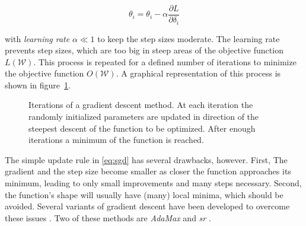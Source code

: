 \begin{equation}
    \label{eq:sgd}
    \theta_i = \theta_i - \alpha \frac{\partial L}{\partial \delta_i}
\end{equation}

with \textit{learning rate} $\alpha \ll 1$ to keep the step sizes moderate. The learning rate prevents step sizes, which are too big in steep 
areas of the objective function $L(\mathcal{W})$.
This process is repeated for a defined number of iterations to minimize the objective function $O(\mathcal{W})$.
A graphical representation of this process is shown in figure~\ref{fig:sgd}.

\begin{figure}[H]
    \centering
    

    \caption[Gradient Descent]{Iterations of a gradient descent method. At each iteration the randomly initialized parameters are updated in 
    direction of the steepest descent of the function to be optimized. After enough iterations a minimum of the function is reached.}
    \label{fig:sgd}
\end{figure}

The simple update rule in \ref{eq:sgd} has several drawbacks, however. First, The gradient and the step size become smaller as closer the function approaches its minimum, leading to only small improvements and many steps necessary.
Second, the function's shape will usually have (many) local minima, which should be avoided.
Several variants of gradient descent have been developed to overcome these issues \cite{ruder2016overview}.
Two of these methods are \textit{AdaMax} \cite{ruder2016overview} and \textit{\gls{sr}} \cite{sorella1998green}.

